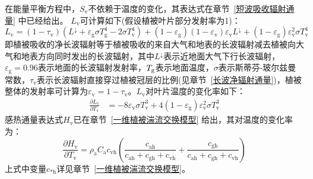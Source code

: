 在能量平衡方程中，$S_{\mathrm v}$不依赖于温度的变化，其表达式在章节~\ref{短波吸收辐射通量} 中已经给出。
$L_{\mathrm v}$可计算如下(假设植被叶片部分发射率为1)：
\begin{equation}
  L_{\mathrm{v}}=\left(1-\tau_{\mathrm{v}}\right)\left(L ^\downarrow+\varepsilon_{\mathrm{g}} \sigma T_{\mathrm{g}}^{4}-2 \sigma T_{\mathrm{v}}^{4}\right) + \left( 1- \varepsilon_{\mathrm{g}} \right )\left(1-\varepsilon_{\mathrm{v}} \right)\varepsilon_{\mathrm{v}} L^\downarrow + \left( 1- \varepsilon_{\mathrm{g}} \right ) \varepsilon_{\mathrm{v}}^2 \sigma T_{\mathrm{v}}^4
\end{equation}
即植被吸收的净长波辐射等于植被吸收的来自大气和地表的长波辐射减去植被向大气和地表方向同时发出的长波辐射，其中$L^\downarrow$表示近地面大气下行长波辐射，$\varepsilon_{\mathrm {g}} =0.96$表示地面的长波辐射发射率，$T_{\rm g}$表示地面温度，$\sigma$表示斯蒂芬-玻尔兹曼常数，$\tau_{\mathrm{v}}$表示长波辐射直接穿过植被冠层的比例(见章节~\ref{长波净辐射通量})，植被整体的发射率可计算为$\varepsilon_{\mathrm v}=1-\tau_{\mathrm v}$。$L_{\mathrm v}$对叶片温度的变化率如下：
\begin{equation}
  \begin{aligned}
    \frac{\partial L_{\mathrm{v}}}{\partial T_{\mathrm{v}}} &= -8 \varepsilon_{\mathrm{v}}\sigma T_{\mathrm{v}}^{3} + 4 \left( 1- \varepsilon_{\mathrm{g}} \right ) \varepsilon_{\mathrm{v}}^2 \sigma T_{\mathrm{v}}^3
  \end{aligned}
\end{equation}
感热通量表达式$H_{\mathrm{v}}$已在章节~\ref{一维植被湍流交换模型} 给出，其对温度的变化率为：
\begin{equation}
  \frac{\partial H_{\mathrm{v}}}{\partial T_{\mathrm{v}}}=\rho_{\mathrm{a}} C_{\mathrm{a}} c_{\mathrm{vh}} \left( \frac{c_{\mathrm{ah}}}{c_{\mathrm{ah}} + c_{\mathrm{gh}} + c_{\mathrm{vh}}} + \frac{c_{\mathrm{gh}}}{c_{\mathrm{ah}} + c_{\mathrm{gh}} + c_{\mathrm{vh}}} \right)
\end{equation}
上式中变量$c_{\mathrm{*h}}$详见章节~\ref{一维植被湍流交换模型}。

